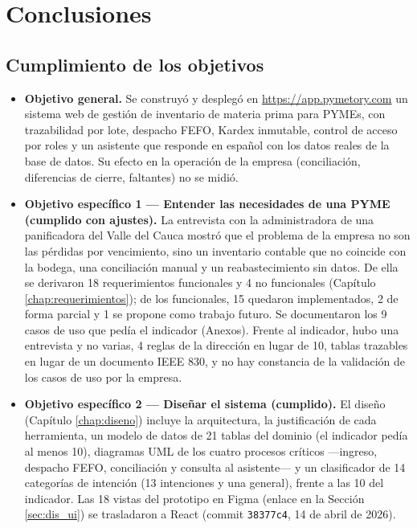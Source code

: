 
\section{Conclusiones}

\subsection{Cumplimiento de los objetivos}

\begin{itemize}
    \item \textbf{Objetivo general.} Se construyó y desplegó en \url{https://app.pymetory.com} un sistema web de gestión de inventario de materia prima para PYMEs, con trazabilidad por lote, despacho FEFO, Kardex inmutable, control de acceso por roles y un asistente que responde en español con los datos reales de la base de datos. Su efecto en la operación de la empresa (conciliación, diferencias de cierre, faltantes) no se midió.

    \item \textbf{Objetivo específico 1 --- Entender las necesidades de una PYME (cumplido con ajustes).} La entrevista con la administradora de una panificadora del Valle del Cauca mostró que el problema de la empresa no son las pérdidas por vencimiento, sino un inventario contable que no coincide con la bodega, una conciliación manual y un reabastecimiento sin datos. De ella se derivaron 18 requerimientos funcionales y 4 no funcionales (Capítulo \ref{chap:requerimientos}); de los funcionales, 15 quedaron implementados, 2 de forma parcial y 1 se propone como trabajo futuro. Se documentaron los 9 casos de uso que pedía el indicador (Anexos). Frente al indicador, hubo una entrevista y no varias, 4 reglas de la dirección en lugar de 10, tablas trazables en lugar de un documento IEEE 830, y no hay constancia de la validación de los casos de uso por la empresa.

    \item \textbf{Objetivo específico 2 --- Diseñar el sistema (cumplido).} El diseño (Capítulo \ref{chap:diseno}) incluye la arquitectura, la justificación de cada herramienta, un modelo de datos de 21 tablas del dominio (el indicador pedía al menos 10), diagramas UML de los cuatro procesos críticos ---ingreso, despacho FEFO, conciliación y consulta al asistente--- y un clasificador de 14 categorías de intención (13 intenciones y una general), frente a las 10 del indicador. Las 18 vistas del prototipo en Figma (enlace en la Sección \ref{sec:dis_ui}) se trasladaron a React (commit \texttt{38377c4}, 14 de abril de 2026).


\end{itemize}
